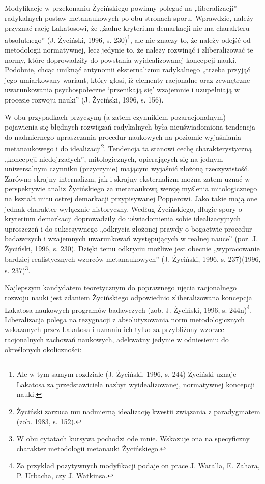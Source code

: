 \documentclass{article}
\begin{document}
Modyfikacje w przekonaniu Życińskiego powinny polegać na „liberalizacji” radykalnych postaw metanaukowych po obu
stronach sporu. Wprawdzie, należy przyznać rację Lakatosowi, że „żadne kryterium demarkacji nie ma charakteru
absolutnego” \label{ref:RNDlahtfGg0vv}(J. Życiński, 1996, s. 230)\footnote{Ale w tym samym rozdziale
\label{ref:RNDU4zrzQHMRM}(J. Życiński, 1996, s. 244) Życiński uznaje Lakatosa za przedstawiciela nazbyt
wyidealizowanej, normatywnej koncepcji nauki.}, ale nie znaczy to, że należy odejść od metodologii normatywnej, lecz
jedynie to, że należy rozwinąć i zliberalizować te normy, które doprowadziły do powstania wyidealizowanej koncepcji
nauki. Podobnie, chcąc uniknąć antynomii eksternalizmu radykalnego „trzeba przyjąć jego umiarkowany wariant, który
głosi, iż elementy racjonalne oraz zewnętrzne uwarunkowania psychospołeczne ‘przenikają się’ wzajemnie i uzupełniają w
procesie rozwoju nauki” \label{ref:RND0qiCuFReRd}(J. Życiński, 1996, s. 156).

W obu przypadkach przyczyną (a zatem czynnikiem pozaracjonalnym) pojawienia się błędnych rozwiązań radykalnych była
nieuświadomiona tendencja do nadmiernego upraszczania procedur naukowych na poziomie wyjaśniania metanaukowego i do
idealizacji\footnote{Życiński zarzuca mu nadmierną idealizację kwestii związania z paradygmatem
\label{ref:RNDIrA1jDg11P}(zob. 1983, s. 152).}. Tendencja ta stanowi cechę charakterystyczną „koncepcji niedojrzałych”,
mitologicznych, opierających się na jednym uniwersalnym czynniku (przyczynie) mającym wyjaśnić złożoną rzeczywistość.
Zarówno skrajny internalizm, jak i skrajny eksternalizm można zatem uznać w perspektywie analiz Życińskiego za
metanaukową wersję myślenia mitologicznego na kształt mitu ostrej demarkacji przypisywanej Popperowi. Jako takie mają
one jednak charakter wyłącznie historyczny. Według Życińskiego, długie spory o kryterium demarkacji doprowadziły do
uświadomienia sobie idealizacyjnych uproszczeń i do sukcesywnego „odkrycia złożonej prawdy o bogactwie procedur
badawczych i wzajemnych uwarunkowań występujących w realnej nauce” \label{ref:RNDT7FuhQK2nh}(por. J. Życiński, 1996, s.
230). Dzięki temu odkryciu możliwe jest obecnie „wypracowanie bardziej realistycznych wzorców metanaukowych”
\label{ref:RND3dNAmoO0qC}(J. Życiński, 1996, s. 237)(1996, s. 237)\footnote{W obu cytatach kursywa pochodzi ode mnie.
Wskazuje ona na specyficzny charakter metodologii metanauki Życińskiego.}.

Najlepszym kandydatem teoretycznym do poprawnego ujęcia racjonalnego rozwoju nauki jest zdaniem Życińskiego odpowiednio
zliberalizowana koncepcja Lakatosa naukowych programów badawczych \label{ref:RNDR4AQgoKDGC}(zob. J. Życiński, 1996, s.
244n)\footnote{Za przykład pozytywnych modyfikacji podaje on prace J. Waralla, E. Zahara, P. Urbacha, czy J.
Watkinsa.}. Liberalizacja polega na rezygnacji z absolutyzowania norm metodologicznych wskazanych przez Lakatosa i
uznaniu ich tylko za przybliżony wzorzec racjonalnych zachowań naukowych, adekwatny jedynie w odniesieniu do
określonych okoliczności:
\end{document}
